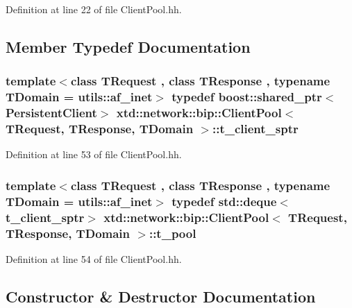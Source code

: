 Definition at line 22 of file Client\+Pool.\+hh.



\subsection{Member Typedef Documentation}
\subsubsection[{\texorpdfstring{t\+\_\+client\+\_\+sptr}{t_client_sptr}}]{\setlength{\rightskip}{0pt plus 5cm}template$<$class T\+Request , class T\+Response , typename T\+Domain  = utils\+::af\+\_\+inet$>$ typedef boost\+::shared\+\_\+ptr$<${\bf Persistent\+Client}$>$ {\bf xtd\+::network\+::bip\+::\+Client\+Pool}$<$ T\+Request, T\+Response, T\+Domain $>$\+::{\bf t\+\_\+client\+\_\+sptr}}\hypertarget{classxtd_1_1network_1_1bip_1_1ClientPool_ac3b215a76aeb124011801824f993a52b}{}\label{classxtd_1_1network_1_1bip_1_1ClientPool_ac3b215a76aeb124011801824f993a52b}


Definition at line 53 of file Client\+Pool.\+hh.

\subsubsection[{\texorpdfstring{t\+\_\+pool}{t_pool}}]{\setlength{\rightskip}{0pt plus 5cm}template$<$class T\+Request , class T\+Response , typename T\+Domain  = utils\+::af\+\_\+inet$>$ typedef std\+::deque$<${\bf t\+\_\+client\+\_\+sptr}$>$ {\bf xtd\+::network\+::bip\+::\+Client\+Pool}$<$ T\+Request, T\+Response, T\+Domain $>$\+::{\bf t\+\_\+pool}}\hypertarget{classxtd_1_1network_1_1bip_1_1ClientPool_ab0b045804570a41e6e491a715d56a469}{}\label{classxtd_1_1network_1_1bip_1_1ClientPool_ab0b045804570a41e6e491a715d56a469}


Definition at line 54 of file Client\+Pool.\+hh.



\subsection{Constructor \& Destructor Documentation}
